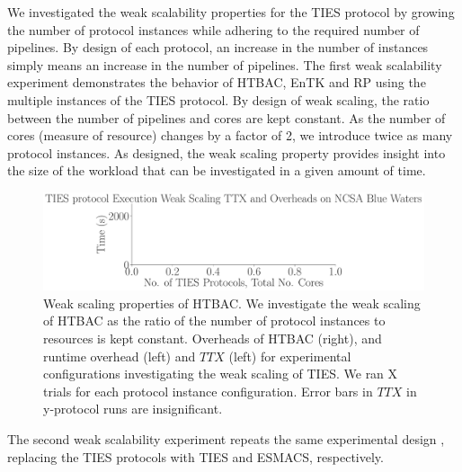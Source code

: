 
We investigated the weak scalability properties for the TIES protocol by
growing the number of protocol instances while adhering to the required
number of pipelines. By design of each protocol, an increase in the number of
instances simply means an increase in the number of pipelines. The first weak
scalability experiment demonstrates the behavior of HTBAC, EnTK and RP using
the multiple instances of the TIES protocol. By design of weak scaling, the
ratio between the number of pipelines and cores are kept constant. As the
number of cores (measure of resource) changes by a factor of 2, we introduce
twice as many protocol instances. As designed, the weak scaling property
provides insight into the size of the workload that can be investigated in a
given amount of time.

\begin{figure}
  \centering
    \includegraphics[width=\columnwidth]{figures/ties_ws_pseudo.pdf}
    \caption{Weak scaling properties of HTBAC. We investigate the weak
    scaling of HTBAC as the ratio of the number of protocol instances to
    resources is kept constant. Overheads of HTBAC (right), and runtime
    overhead (left) and \(TTX\) (left) for experimental configurations
    investigating the weak scaling of TIES. We ran X trials for each protocol
    instance configuration. Error bars in \(TTX\) in y-protocol runs are
    insignificant.}
\label{fig:weak_scaling_TIES}
\end{figure}

The second weak scalability experiment repeats the same experimental design
, replacing the TIES protocols  with TIES and ESMACS, respectively. 

